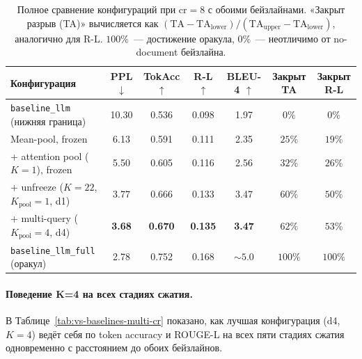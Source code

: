 \documentclass[a4paper,12pt]{extarticle}
\begin{document}
\begin{table}[ht]
\centering
\caption{Полное сравнение конфигураций при $\text{cr}=8$ с обоими бейзлайнами. «Закрыт разрыв (TA)» вычисляется как $(\mathrm{TA} - \mathrm{TA}_{\text{lower}}) / (\mathrm{TA}_{\text{upper}} - \mathrm{TA}_{\text{lower}})$, аналогично для R-L. $100\%$~--- достижение оракула, $0\%$~--- неотличимо от no-document бейзлайна.}
\label{tab:vs-baselines-cr8}
\footnotesize
\begin{tabular}{lcccccc}
\toprule
\textbf{Конфигурация} & \textbf{PPL} $\downarrow$ & \textbf{TokAcc} $\uparrow$ & \textbf{R-L} $\uparrow$ & \textbf{BLEU-4} $\uparrow$ & \textbf{Закрыт TA} & \textbf{Закрыт R-L} \\
\midrule
\texttt{baseline\_llm} (нижняя граница)              & 10.30          & 0.536          & 0.098          & 1.97           & $0\%$            & $0\%$ \\
\midrule
Mean-pool, frozen                                    & 6.13           & 0.591          & 0.111          & 2.35           & $25\%$           & $19\%$ \\
\;\;+ attention pool ($K=1$), frozen                 & 5.50           & 0.605          & 0.116          & 2.56           & $32\%$           & $26\%$ \\
\;\;+ unfreeze ($K=22$, $K_\text{pool}=1$, d1)       & 3.77           & 0.666          & 0.133          & 3.47           & $60\%$           & $50\%$ \\
\;\;+ multi-query ($K_\text{pool}=4$, d4)            & \textbf{3.68}  & \textbf{0.670} & \textbf{0.135} & \textbf{3.47}  & \textbf{$62\%$}  & \textbf{$53\%$} \\
\midrule
\texttt{baseline\_llm\_full} (оракул)                & 2.78           & 0.752          & 0.168          & $\sim 5.0$     & $100\%$          & $100\%$ \\
\bottomrule
\end{tabular}
\end{table}

\paragraph{Поведение K=4 на всех стадиях сжатия.} В Таблице~\ref{tab:vs-baselines-multi-cr} показано, как лучшая конфигурация (d4, $K=4$) ведёт себя по token accuracy и ROUGE-L на всех пяти стадиях сжатия одновременно с расстоянием до обоих бейзлайнов.
\end{document}
